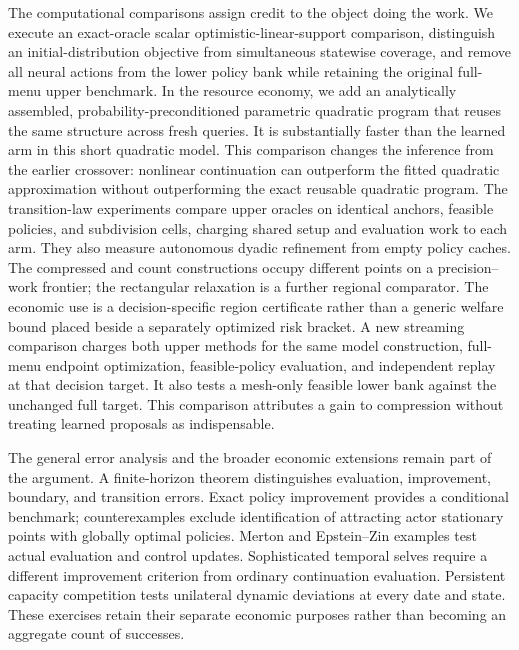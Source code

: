 The computational comparisons assign credit to the object doing the work. We execute an exact-oracle scalar optimistic-linear-support comparison, distinguish an initial-distribution objective from simultaneous statewise coverage, and remove all neural actions from the lower policy bank while retaining the original full-menu upper benchmark. In the resource economy, we add an analytically assembled, probability-preconditioned parametric quadratic program that reuses the same structure across fresh queries. It is substantially faster than the learned arm in this short quadratic model. This comparison changes the inference from the earlier crossover: nonlinear continuation can outperform the fitted quadratic approximation without outperforming the exact reusable quadratic program. The transition-law experiments compare upper oracles on identical anchors, feasible policies, and subdivision cells, charging shared setup and evaluation work to each arm. They also measure autonomous dyadic refinement from empty policy caches. The compressed and count constructions occupy different points on a precision--work frontier; the rectangular relaxation is a further regional comparator. The economic use is a decision-specific region certificate rather than a generic welfare bound placed beside a separately optimized risk bracket. A new streaming comparison charges both upper methods for the same model construction, full-menu endpoint optimization, feasible-policy evaluation, and independent replay at that decision target. It also tests a mesh-only feasible lower bank against the unchanged full target. This comparison attributes a gain to compression without treating learned proposals as indispensable.

The general error analysis and the broader economic extensions remain part of the argument. A finite-horizon theorem distinguishes evaluation, improvement, boundary, and transition errors. Exact policy improvement provides a conditional benchmark; counterexamples exclude identification of attracting actor stationary points with globally optimal policies. Merton and Epstein--Zin examples test actual evaluation and control updates. Sophisticated temporal selves require a different improvement criterion from ordinary continuation evaluation. Persistent capacity competition tests unilateral dynamic deviations at every date and state. These exercises retain their separate economic purposes rather than becoming an aggregate count of successes.

